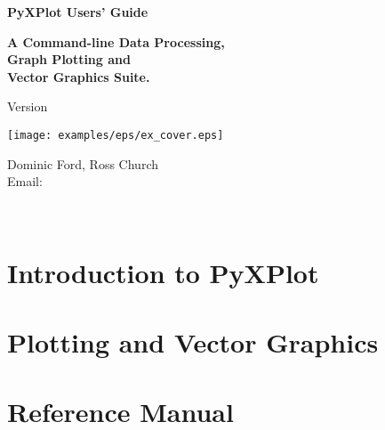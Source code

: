\documentclass[a4paper,onecolumn,11pt]{book}
\begin{document}
\begin{titlepage}
\normalsize
\vspace*{0.5cm}
\begin{center}
{\Huge \bf PyXPlot Users' Guide}\\
\end{center}
\vspace*{0.5cm}
\begin{center}
{\LARGE \bf A Command-line Data Processing, \\ \vspace{2mm} Graph Plotting and \\ \vspace{2mm} Vector Graphics Suite. \\}
\end{center}
\vspace*{0.5cm}
\begin{center}
{\Large Version \version \\}
\end{center}
\vspace*{0.0cm}
\begin{center}
\texttt{[image: examples/eps/ex\_cover.eps]}
\end{center}
\vspace*{0.0cm}
\begin{center}
{\Large Dominic Ford, Ross Church \\ \vspace{2mm} Email:  \\ }
\end{center}
\vspace*{0.5cm}
\begin{center}
{\Large \reldate \\}
\end{center}
\end{titlepage}


\tableofcontents

\listoffigures
{}

\part{Introduction to PyXPlot}






\part{Plotting and Vector Graphics}


\part{Reference Manual}








\appendix





\printindex
\end{document}
